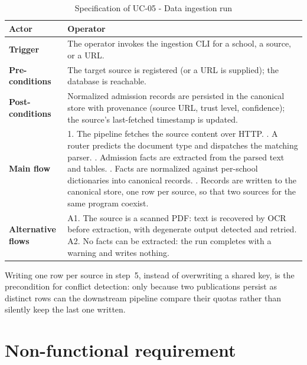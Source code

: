 \documentclass[../main.tex]{subfiles}
\begin{document}
\begin{table}[H]
    \centering
    \caption{Specification of UC-05 - Data ingestion run}
    \label{table:uc05}
    \begin{tabular}{|p{3.2cm}|p{10.3cm}|}
        \hline
        \textbf{Actor} & Operator \\
        \hline
        \textbf{Trigger} & The operator invokes the ingestion \gls{CLI} for a school, a source, or a \gls{URL}. \\
        \hline
        \textbf{Pre-conditions} & The target source is registered (or a \gls{URL} is supplied); the database is reachable. \\
        \hline
        \textbf{Post-conditions} & Normalized admission records are persisted in the canonical store with provenance (source \gls{URL}, trust level, confidence); the source's last-fetched timestamp is updated. \\
        \hline
        \textbf{Main flow} &
        1. The pipeline fetches the source content over \gls{HTTP}. \newline
        2. A router predicts the document type and dispatches the matching parser. \newline
        3. Admission facts are extracted from the parsed text and tables. \newline
        4. Facts are normalized against per-school dictionaries into canonical records. \newline
        5. Records are written to the canonical store, one row per source, so that two sources for the same program coexist. \\
        \hline
        \textbf{Alternative flows} &
        A1. The source is a scanned \gls{PDF}: text is recovered by \gls{OCR} before extraction, with degenerate output detected and retried. \newline
        A2. No facts can be extracted: the run completes with a warning and writes nothing. \\
        \hline
    \end{tabular}
\end{table}

Writing one row per source in step~5, instead of overwriting a shared key, is the precondition for conflict detection: only because two publications persist as distinct rows can the downstream pipeline compare their quotas rather than silently keep the last one written.

\section{Non-functional requirement}
\label{section:2.4}
\end{document}
